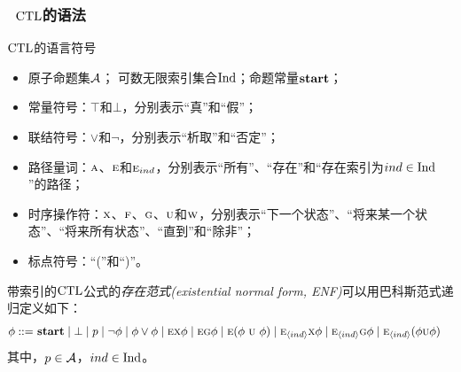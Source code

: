 \documentclass[9pt, CJK]{beamer}
\begin{document}
\begin{frame} 
	\frametitle{~$\textrm{CTL}$的语法}
	{\footnotesize 
			\begin{block}{$\textrm{CTL}$的语言符号}
			\begin{itemize}
				\item 原子命题集${\cal A}$； \quad 可数无限索引集合$\textrm{Ind}$；\quad 命题常量$\textbf{start}$；
				\item 常量符号：$\top$和$\bot$，分别表示“真”和“假”；
				\item 联结符号：$\vee$和$\neg$，分别表示“析取”和“否定”；
				\item 路径量词：$\textsc{a}$、$\textsc{e}$和$\textsc{e}_{ind}$，分别表示“所有”、“存在”和“存在索引为$ind\in \textrm{Ind}$”的路径；
				\item 时序操作符：$\textsc{x}$、$\textsc{f}$、$\textsc{g}$、$\textsc{u}$和$\textsc{w}$，分别表示“下一个状态”、“将来某一个状态”、“将来所有状态”、“直到”和“除非”；
				\item 标点符号：“(”和“)”。
			\end{itemize}
		\end{block}
		\begin{definition}
			带索引的$\textrm{CTL}$公式的\emph{存在范式(existential normal form, ENF)}可以用巴科斯范式递归定义如下：
			\begin{align*}
				\phi  ::= & \ \start\mid \bot %
				\mid p \mid\neg\phi \mid \phi\lor\phi \mid
				\EXIST \NEXT \phi \mid
				\EXIST \GLOBAL \phi \mid 
				\EXIST (\phi\ \UNTILL\ \phi)\mid 
				\EXIST_{\tuple{ind}}\NEXT \phi  \mid 
				\EXIST_{\tuple{ind}}\GLOBAL \phi \mid
				\EXIST_{\tuple{ind}}(\phi \UNTILL \phi)  
			\end{align*}
		其中，$p\in {\cal A}$，$ind \in \textrm{Ind}$。
		

\end{definition}}
\end{frame}
\end{document}
